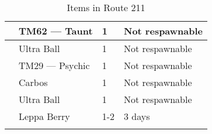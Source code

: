 \begin{longtable}{|| l l l l ||}%
\hline%
&TM62 — Taunt&1&Not respawnable\\%
\hline%
&Ultra Ball&1&Not respawnable\\%
\hline%
&TM29 — Psychic&1&Not respawnable\\%
\hline%
&Carbos&1&Not respawnable\\%
\hline%
&Ultra Ball&1&Not respawnable\\%
\hline%
&Leppa Berry&1{-}2&3 days\\%
\hline%
\endhead%
\hline%
\caption{Items in Route 211}%
\label{tab:Route211Items}%
\end{longtable}